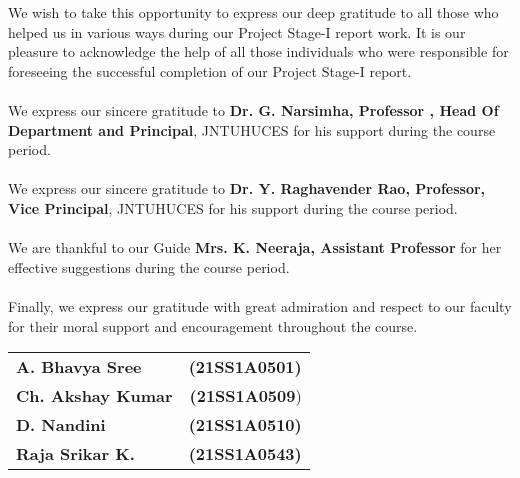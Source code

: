 \documentclass[12pt,a4paper]{report}
\renewcommand{\baselinestretch}{1.25}
\begin{document}
 {We wish to take this opportunity to express our deep gratitude to all those who helped us in various ways during our Project Stage-I report work. It is our pleasure to acknowledge the help of all those individuals who were responsible for foreseeing the successful completion of our Project Stage-I report.\\ \\
\hspace*{35pt}We express our sincere gratitude to \textbf{\large Dr. G. Narsimha, Professor , Head Of Department and Principal}, JNTUHUCES for his support during the course period.\\ \\
\hspace*{35pt}We express our sincere gratitude to \textbf{\large Dr. Y. Raghavender Rao, Professor, Vice Principal}, JNTUHUCES for his support during the course period.\\ \\
\hspace*{35pt}We are thankful to our Guide \textbf{\large Mrs. K. Neeraja, Assistant Professor} for her effective suggestions  during the course period.\\ \\
\hspace*{35pt}Finally, we express our gratitude with great admiration and respect to our faculty for their moral support and encouragement throughout the course.}\\
\begin{table}[ht]
	\begin{flushright}
		\begin{tabular}{l r}
		\textbf{\large A. Bhavya Sree} & \textbf{\large (21SS1A0501)}\\
        \textbf{\large Ch. Akshay Kumar} & \textbf{\large (21SS1A0509})\\
        \textbf{\large D. Nandini} & \textbf{\large (21SS1A0510)}\\
		\textbf{\large Raja Srikar K.} & \textbf{\large (21SS1A0543)}\\
		\end{tabular}
	\end{flushright}
\end{table}

\newpage
\tableofcontents
{}
\end{document}
